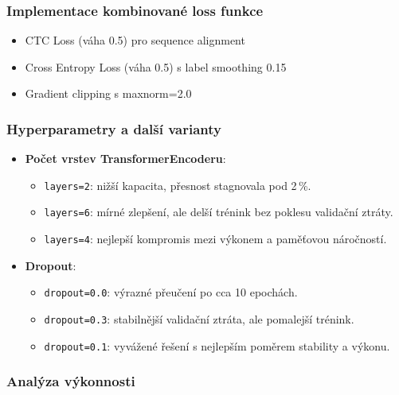 \subsubsection{Implementace kombinované loss funkce}
\begin{itemize}
    \item CTC Loss (váha 0.5) pro sequence alignment
    \item Cross Entropy Loss (váha 0.5) s label smoothing 0.15
    \item Gradient clipping s max\textunderscore norm=2.0
\end{itemize}

\subsubsection{Hyperparametry a další varianty}

\begin{itemize}
    \item \textbf{Počet vrstev TransformerEncoderu}:
    \begin{itemize}
        \item \texttt{layers=2}: nižší kapacita, přesnost stagnovala pod 2\,\%.
        \item \texttt{layers=6}: mírné zlepšení, ale delší trénink bez poklesu validační ztráty.
        \item \texttt{layers=4}: nejlepší kompromis mezi výkonem a paměťovou náročností.
    \end{itemize}
    
    \item \textbf{Dropout}:
    \begin{itemize}
        \item \texttt{dropout=0.0}: výrazné přeučení po cca 10 epochách.
        \item \texttt{dropout=0.3}: stabilnější validační ztráta, ale pomalejší trénink.
        \item \texttt{dropout=0.1}: vyvážené řešení s nejlepším poměrem stability a výkonu.
    \end{itemize}
\end{itemize}

\vspace{1em}

\subsubsection{Analýza výkonnosti}

